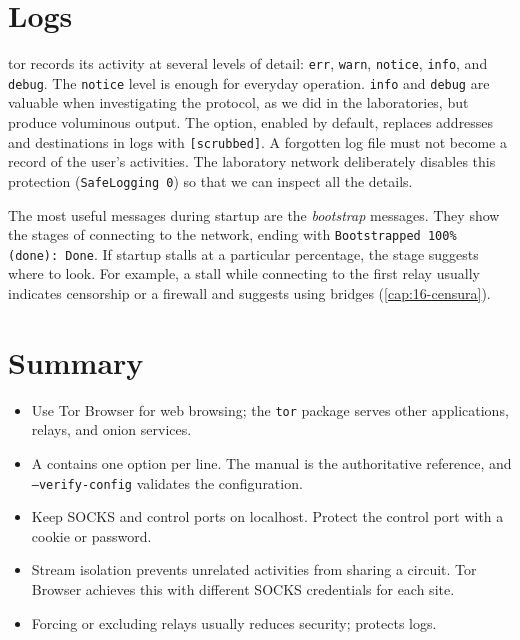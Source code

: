 \section{Logs}\label{sec:torrc-log}

tor records its activity at several levels of detail: \texttt{err}, \texttt{warn}, \texttt{notice}, \texttt{info}, and \texttt{debug}. The \texttt{notice} level is enough for everyday operation. \texttt{info} and \texttt{debug} are valuable when investigating the protocol, as we did in the laboratories, but produce voluminous output. The  option, enabled by default, replaces addresses and destinations in logs with \texttt{[scrubbed]}. A forgotten log file must not become a record of the user's activities. The laboratory network deliberately disables this protection (\texttt{SafeLogging 0}) so that we can inspect all the details.

The most useful messages during startup are the \emph{bootstrap} messages. They show the stages of connecting to the network, ending with \texttt{Bootstrapped 100\% (done): Done}. If startup stalls at a particular percentage, the stage suggests where to look. For example, a stall while connecting to the first relay usually indicates censorship or a firewall and suggests using bridges (\cref{cap:16-censura}).

\section*{Summary}
\begin{itemize}
  \item Use Tor Browser for web browsing; the \texttt{tor} package serves other applications, relays, and onion services.
  \item A  contains one option per line. The manual is the authoritative reference, and \texttt{--verify-config} validates the configuration.
  \item Keep SOCKS and control ports on localhost. Protect the control port with a cookie or password.
  \item Stream isolation prevents unrelated activities from sharing a circuit. Tor Browser achieves this with different SOCKS credentials for each site.
  \item Forcing or excluding relays usually reduces security;  protects logs.
\end{itemize}

